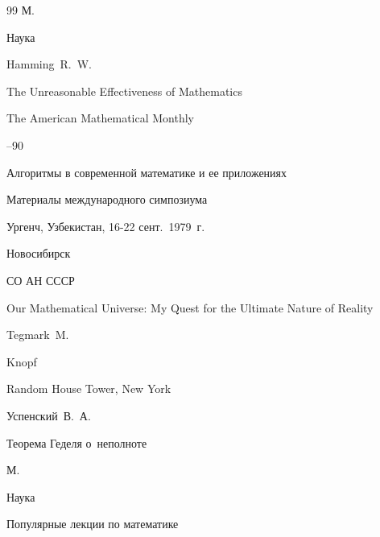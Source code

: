 \begin{thebibliography}{99}
\publaddr М.

\publ Наука






\by Hamming~R.~W.

\paper The Unreasonable Effectiveness of Mathematics

\jour The American Mathematical Monthly




--90





\book Алгоритмы в современной математике и ее приложениях

\bookinfo  Материалы международного симпозиума

\procinfo Ургенч, Узбекистан, 16-22 сент.~1979~г.

\publaddr Новосибирск

\publ СО АН СССР






\book Our Mathematical Universe: My Quest for the Ultimate Nature of Reality


\by Tegmark~M.


\publ Knopf

\publaddr Random House Tower, New York






\by Успенский~В.~А.

\book Теорема Геделя о~неполноте

\publaddr М.

\publ Наука



\serial Популярные лекции по математике





\end{thebibliography}
